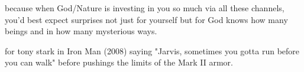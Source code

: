 because when God/Nature is investing in you so much via all these channels, you'd best expect surprises not just for yourself but for God knows how many beings and in how many mysterious ways.

for tony stark in Iron Man (2008) saying "Jarvis, sometimes you gotta run before you can walk" before pushings the limits of the Mark II armor.